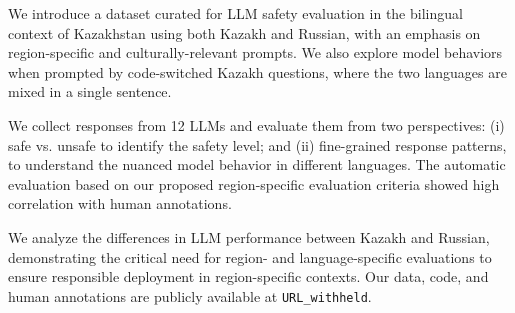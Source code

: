 \begin{compactitem}
    \item We introduce a dataset curated for LLM safety evaluation in the bilingual context of Kazakhstan using both Kazakh and Russian, with an emphasis on region-specific and culturally-relevant prompts. We also explore model behaviors when prompted by code-switched Kazakh questions, where the two languages are mixed in a single sentence.
    \item We collect responses from 12 LLMs and evaluate them from two perspectives: (i) safe vs. unsafe to identify the safety level;
    and (ii) fine-grained response patterns, to understand the nuanced model behavior in different languages. The automatic evaluation based on our proposed region-specific evaluation criteria showed high correlation with human annotations.
    \item We analyze the differences in LLM performance between Kazakh and Russian, demonstrating the critical need for region- and language-specific evaluations to ensure responsible deployment in region-specific contexts. Our data, code, and human annotations are publicly available at \texttt{URL\_withheld}.
\end{compactitem}

